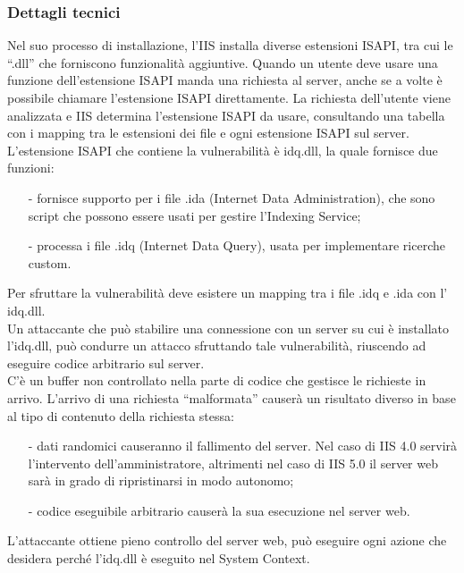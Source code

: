 \subsubsection{Dettagli tecnici}
Nel suo processo di installazione, l’IIS installa diverse estensioni ISAPI, tra cui le “.dll” che forniscono funzionalità aggiuntive.
Quando un utente deve usare una funzione dell’estensione ISAPI manda una richiesta al server, anche se a volte è possibile chiamare l’estensione ISAPI direttamente. La richiesta dell’utente viene analizzata e IIS determina l’estensione ISAPI da usare, consultando una tabella con i mapping tra le estensioni dei file e ogni estensione ISAPI sul server.\\
L’estensione ISAPI che contiene la vulnerabilità è idq.dll, la quale fornisce due funzioni:
\begin{itemize}
\item[-]fornisce supporto per i file .ida (Internet Data Administration), che sono script che possono essere usati per gestire l’Indexing Service;
\item[-]processa i file .idq (Internet Data Query), usata per implementare ricerche custom.
\end{itemize}

Per sfruttare la vulnerabilità deve esistere un mapping tra i file .idq e .ida con l’ idq.dll.\\
Un attaccante che può stabilire una connessione con un server su cui è installato l’idq.dll, può condurre un attacco sfruttando tale vulnerabilità, riuscendo ad eseguire codice arbitrario sul server.\\
C’è un buffer non controllato nella parte di codice che gestisce le richieste in arrivo. L’arrivo di una richiesta “malformata” causerà un risultato diverso in base al tipo di contenuto della richiesta stessa:
\begin{itemize}
\item[-]dati randomici causeranno il fallimento del server. Nel caso di IIS 4.0 servirà l’intervento dell’amministratore, altrimenti nel caso di IIS 5.0 il server web sarà in grado di ripristinarsi in modo autonomo;
\item[-]codice eseguibile arbitrario causerà la sua esecuzione nel server web.
\end{itemize}

L’attaccante ottiene pieno controllo del server web, può eseguire ogni azione che desidera perché l’idq.dll è eseguito nel System Context.\\

